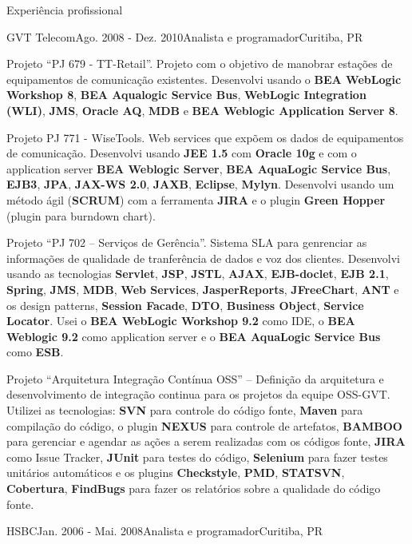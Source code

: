\documentclass{resume}
\begin{document}
\begin{rSection}{Experiência profissional}
\begin{rSubsection}{GVT Telecom}{Ago. 2008 - Dez. 2010}{Analista e programador}{Curitiba, PR}
    \item Projeto “PJ 679 - TT-Retail”. Projeto com o objetivo de manobrar estações de equipamentos de comunicação existentes. Desenvolvi usando o \textbf{BEA WebLogic Workshop 8}, \textbf{BEA Aqualogic Service Bus}, \textbf{WebLogic Integration (WLI)}, \textbf{JMS}, \textbf{Oracle AQ}, \textbf{MDB} e \textbf{BEA Weblogic Application Server 8}.\\
    \item Projeto PJ 771 - WiseTools. Web services que expõem os dados de equipamentos de comunicação. Desenvolvi usando \textbf{JEE 1.5} com \textbf{Oracle 10g} e com o application server \textbf{BEA Weblogic Server}, \textbf{BEA AquaLogic Service Bus}, \textbf{EJB3}, \textbf{JPA}, \textbf{JAX-WS 2.0}, \textbf{JAXB}, \textbf{Eclipse}, \textbf{Mylyn}. Desenvolvi usando um método ágil (\textbf{SCRUM}) com a ferramenta \textbf{JIRA} e o plugin \textbf{Green Hopper} (plugin para burndown chart).\\
    \item Projeto “PJ 702 – Serviços de Gerência”. Sistema SLA para genrenciar as informações de qualidade de tranferência de dados e voz dos clientes. Desenvolvi usando as tecnologias \textbf{Servlet}, \textbf{JSP}, \textbf{JSTL}, \textbf{AJAX}, \textbf{EJB-doclet}, \textbf{EJB 2.1}, \textbf{Spring}, \textbf{JMS}, \textbf{MDB}, \textbf{Web Services}, \textbf{JasperReports}, \textbf{JFreeChart}, \textbf{ANT} e os design patterns, \textbf{Session Facade}, \textbf{DTO}, \textbf{Business Object}, \textbf{Service Locator}. Usei o \textbf{BEA WebLogic Workshop 9.2} como IDE, o \textbf{BEA Weblogic 9.2} como application server e o \textbf{BEA AquaLogic Service Bus} como \textbf{ESB}.\\
    \item Projeto “Arquitetura Integração Contínua OSS” – Definição da arquitetura e desenvolvimento de integração continua para os projetos da equipe OSS-GVT. Utilizei as tecnologias: \textbf{SVN} para controle do código fonte, \textbf{Maven} para compilação do código, o plugin \textbf{NEXUS} para controle de artefatos, \textbf{BAMBOO} para gerenciar e agendar as ações a serem realizadas com os códigos fonte, \textbf{JIRA} como Issue Tracker, \textbf{JUnit} para testes do código, \textbf{Selenium} para fazer testes unitários automáticos e os plugins \textbf{Checkstyle}, \textbf{PMD}, \textbf{STATSVN}, \textbf{Cobertura}, \textbf{FindBugs} para fazer os relatórios sobre a qualidade do código fonte.
    \end{rSubsection}
    \begin{rSubsection}{HSBC}{Jan. 2006 - Mai. 2008}{Analista e programador}{Curitiba, PR}

\end{rSubsection}
\end{rSection}
\end{document}
